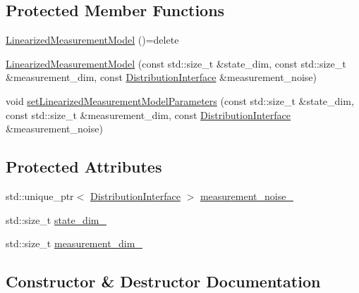 \subsection*{Protected Member Functions}
\begin{DoxyCompactItemize}
\item 
\hyperlink{classrefill_1_1LinearizedMeasurementModel_ac87d48f8d870169199cdb34a643c4286}{Linearized\+Measurement\+Model} ()=delete
\item 
\hyperlink{classrefill_1_1LinearizedMeasurementModel_a9acbec9c9d778a53ba395e7a2fe1ecfa}{Linearized\+Measurement\+Model} (const std\+::size\+\_\+t \&state\+\_\+dim, const std\+::size\+\_\+t \&measurement\+\_\+dim, const \hyperlink{classrefill_1_1DistributionInterface}{Distribution\+Interface} \&measurement\+\_\+noise)
\item 
void \hyperlink{classrefill_1_1LinearizedMeasurementModel_a841db0359ae5ad41bfbe9ed8e1d3f1b6}{set\+Linearized\+Measurement\+Model\+Parameters} (const std\+::size\+\_\+t \&state\+\_\+dim, const std\+::size\+\_\+t \&measurement\+\_\+dim, const \hyperlink{classrefill_1_1DistributionInterface}{Distribution\+Interface} \&measurement\+\_\+noise)
\end{DoxyCompactItemize}
\subsection*{Protected Attributes}
\begin{DoxyCompactItemize}
\item 
std\+::unique\+\_\+ptr$<$ \hyperlink{classrefill_1_1DistributionInterface}{Distribution\+Interface} $>$ \hyperlink{classrefill_1_1LinearizedMeasurementModel_ac15f42823cd7fb338ea5bd79e528627a}{measurement\+\_\+noise\+\_\+}
\item 
std\+::size\+\_\+t \hyperlink{classrefill_1_1LinearizedMeasurementModel_affd27c9960289d05413760b4682140a1}{state\+\_\+dim\+\_\+}
\item 
std\+::size\+\_\+t \hyperlink{classrefill_1_1LinearizedMeasurementModel_ac3f6cee57566f9494706f4e735a65c64}{measurement\+\_\+dim\+\_\+}
\end{DoxyCompactItemize}


\subsection{Constructor \& Destructor Documentation}
